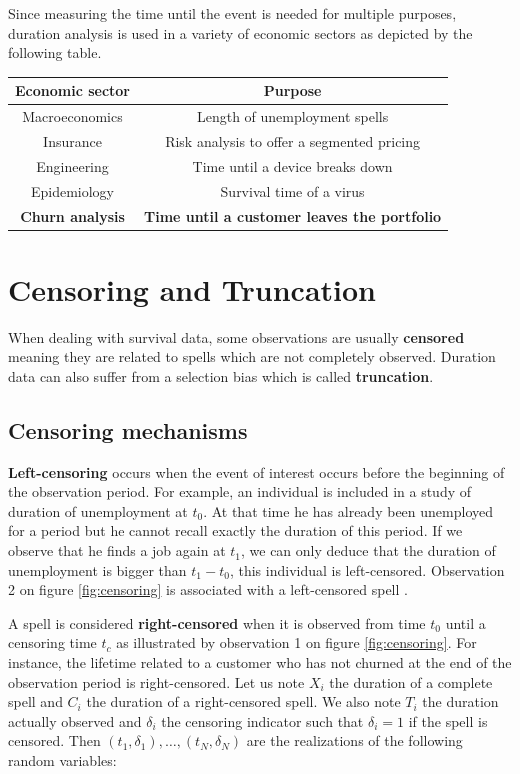 \documentclass[
]{book}
\begin{document}
Since measuring the time until the event is needed for multiple purposes, duration analysis is used in a variety of economic sectors as depicted by the following table.

\begin{longtable}[]{@{}cc@{}}
\toprule
Economic sector & Purpose \\
\midrule
\endhead
Macroeconomics & Length of unemployment spells \\
Insurance & Risk analysis to offer a segmented pricing \\
Engineering & Time until a device breaks down \\
Epidemiology & Survival time of a virus \\
\textbf{Churn analysis} & \textbf{Time until a customer leaves the portfolio} \\
\bottomrule
\end{longtable}

\hypertarget{censoring-and-truncation}{%
\section{Censoring and Truncation}\label{censoring-and-truncation}}

When dealing with survival data, some observations are usually \textbf{censored} meaning they are related to spells which are not completely observed. Duration data can also suffer from a selection bias which is called \textbf{truncation}.

\hypertarget{censoring-mechanisms}{%
\subsection{Censoring mechanisms}\label{censoring-mechanisms}}

\textbf{Left-censoring} occurs when the event of interest occurs before the beginning of the observation period. For example, an individual is included in a study of duration of unemployment at \(t_0\). At that time he has already been unemployed for a period but he cannot recall exactly the duration of this period. If we observe that he finds a job again at \(t_1\), we can only deduce that the duration of unemployment is bigger than \(t_1-t_0\), this individual is left-censored. Observation 2 on figure \ref{fig:censoring} is associated with a left-censored spell \citep{LIU_SCOR}.

A spell is considered \textbf{right-censored} when it is observed from time \(t_0\) until a censoring time \(t_c\) as illustrated by observation 1 on figure \ref{fig:censoring}. For instance, the lifetime related to a customer who has not churned at the end of the observation period is right-censored. Let us note \(X_i\) the duration of a complete spell and \(C_i\) the duration of a right-censored spell. We also note \(T_i\) the duration actually observed and \(\delta_i\) the censoring indicator such that \(\delta_i = 1\) if the spell is censored. Then \((t_1, \delta_1),\dots,(t_N, \delta_N)\) are the realizations of the following random variables:
\end{document}
